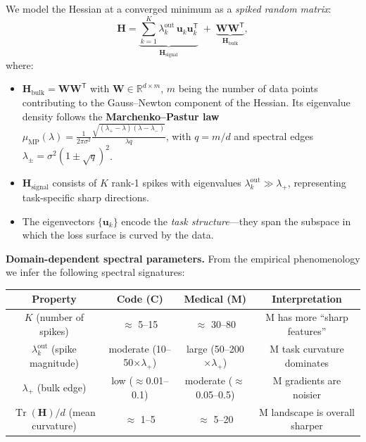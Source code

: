 \documentclass{article}
\DeclareMathOperator{\Tr}{Tr}
\newcommand{\R}{\mathbb{R}}
\newcommand{\Hess}{\mathbf{H}}
\begin{document}
We model the Hessian at a converged minimum as a \emph{spiked random matrix}:
\begin{equation}
\Hess = \underbrace{\sum_{k=1}^K \lambda_k^{\mathrm{out}}\,\mathbf{u}_k\mathbf{u}_k^{\mathsf T}}_{\Hess_{\mathrm{signal}}}
\;+\; \underbrace{\mathbf{W}\mathbf{W}^{\mathsf T}}_{\Hess_{\mathrm{bulk}}},
\label{eq:spiked_hessian}
\end{equation}
where:
\begin{itemize}
\item $\Hess_{\mathrm{bulk}} = \mathbf{W}\mathbf{W}^{\mathsf T}$ with $\mathbf{W}\in\R^{d\times m}$,
$m$ being the number of data points contributing to the Gauss--Newton component of the Hessian.
Its eigenvalue density follows the \textbf{Marchenko--Pastur law}
$\mu_{\mathrm{MP}}(\lambda) = \frac{1}{2\pi\sigma^2}\frac{\sqrt{(\lambda_+-\lambda)(\lambda-\lambda_-)}}{\lambda q}$,
with $q = m/d$ and spectral edges $\lambda_\pm = \sigma^2(1\pm\sqrt{q})^2$.
\item $\Hess_{\mathrm{signal}}$ consists of $K$ rank-1 spikes with eigenvalues
$\lambda_k^{\mathrm{out}} \gg \lambda_+$, representing task-specific sharp directions.
\item The eigenvectors $\{\mathbf{u}_k\}$ encode the \emph{task structure}---they span the subspace
in which the loss surface is curved by the data.
\end{itemize}

\medskip\noindent
\textbf{Domain-dependent spectral parameters.}
From the empirical phenomenology we infer the following spectral signatures:

\begin{center}
\begin{tabular}{c|cc|c}
\textbf{Property} & \textbf{Code (C)} & \textbf{Medical (M)} & \textbf{Interpretation} \\
\hline
$K$ (number of spikes) & $\approx$ 5--15  & $\approx$ 30--80  & M has more ``sharp features'' \\
$\lambda_k^{\mathrm{out}}$ (spike magnitude) & moderate (10--50$\times\lambda_+$) & large (50--200$\times\lambda_+$) & M task curvature dominates \\
$\lambda_+$ (bulk edge) & low ($\approx$0.01--0.1) & moderate ($\approx$0.05--0.5) & M gradients are noisier \\
$\Tr(\Hess)/d$ (mean curvature) & $\approx$ 1--5 & $\approx$ 5--20 & M landscape is overall sharper \\
\end{tabular}
\end{center}
\end{document}
